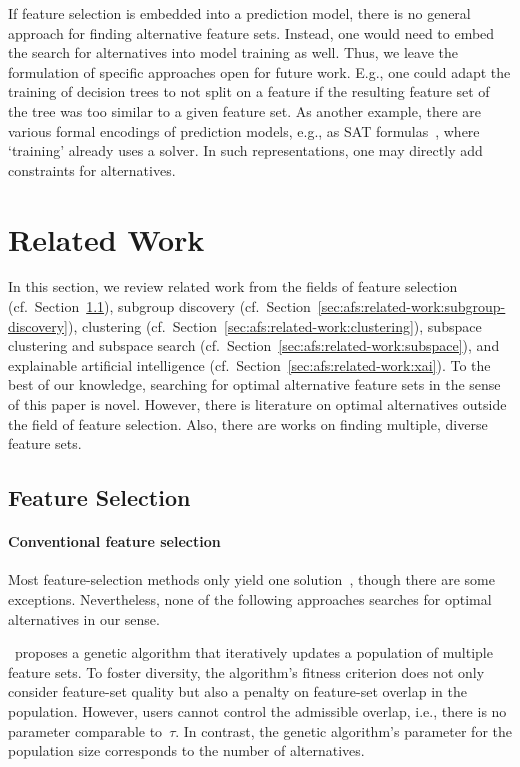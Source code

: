 \documentclass{article}
\theoremstyle{definition}
\begin{document}
If feature selection is embedded into a prediction model, there is no general approach for finding alternative feature sets.
Instead, one would need to embed the search for alternatives into model training as well.
Thus, we leave the formulation of specific approaches open for future work.
E.g., one could adapt the training of decision trees to not split on a feature if the resulting feature set of the tree was too similar to a given feature set.
As another example, there are various formal encodings of prediction models, e.g., as \textsc{SAT} formulas~\cite{narodytska2018learning, schidler2021sat, yu2021learning}, where `training' already uses a solver.
In such representations, one may directly add constraints for alternatives.

\section{Related Work}
\label{sec:afs:related-work}

In this section, we review related work from the fields of feature selection (cf.~Section~\ref{sec:afs:related-work:feature-selection}), subgroup discovery (cf.~Section~\ref{sec:afs:related-work:subgroup-discovery}), clustering (cf.~Section~\ref{sec:afs:related-work:clustering}), subspace clustering and subspace search (cf.~Section~\ref{sec:afs:related-work:subspace}), and explainable artificial intelligence (cf.~Section~\ref{sec:afs:related-work:xai}).
To the best of our knowledge, searching for optimal alternative feature sets in the sense of this paper is novel.
However, there is literature on optimal alternatives outside the field of feature selection.
Also, there are works on finding multiple, diverse feature sets.

\subsection{Feature Selection}
\label{sec:afs:related-work:feature-selection}

\paragraph{Conventional feature selection}

Most feature-selection methods only yield one solution~\cite{borboudakis2021extending}, though there are some exceptions.
Nevertheless, none of the following approaches searches for optimal alternatives in our sense.

\cite{siddiqi2020genetic}~proposes a genetic algorithm that iteratively updates a population of multiple feature sets.
To foster diversity, the algorithm's fitness criterion does not only consider feature-set quality but also a penalty on feature-set overlap in the population.
However, users cannot control the admissible overlap, i.e., there is no parameter comparable to~$\tau$.
In contrast, the genetic algorithm's parameter for the population size corresponds to the number of alternatives.
\end{document}
